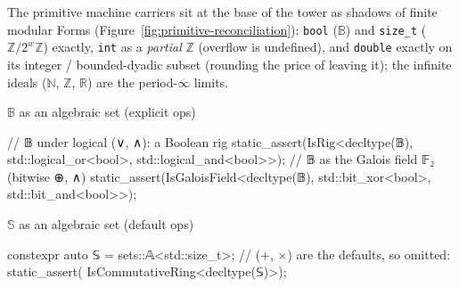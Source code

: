 \documentclass[11pt, a4paper]{article}
\begin{document}
The primitive machine carriers sit at the base of the tower as shadows of finite modular Forms (Figure~\ref{fig:primitive-reconciliation}): \texttt{bool} ($\mathbb{B}$) and \texttt{size\_t} ($\mathbb{Z}/2^{w}\mathbb{Z}$) exactly, \texttt{int} as a \emph{partial} $\mathbb{Z}$ (overflow is undefined), and \texttt{double} exactly on its integer / bounded-dyadic subset (rounding the price of leaving it); the infinite ideals ($\mathbb{N}$, $\mathbb{Z}$, $\mathbb{R}$) are the period-$\infty$ limits.

\begin{listing}[!ht]
\caption{Primitive carriers as \emph{algebraic sets}, inhabiting the set-indexed concepts of Listing~\ref{lst:algebra:universal}.  \textbf{Left:} $\mathbb{B} = \mathbb{A}\langle\texttt{bool}\rangle$ needs \emph{explicit} operators: a Boolean rig under logical $(\vee,\wedge)$ and the Galois field $\mathbb{F}_2$ under bitwise $(\oplus,\wedge)$.  \textbf{Right:} $\mathbb{S} = \mathbb{A}\langle\texttt{size\_t}\rangle$, the modular ring $\mathbb{Z}/2^{w}\mathbb{Z}$ (width $w$ implementation-defined), is a commutative ring under the \emph{default} arithmetic $(+,\times)$, so the operators are omitted.  The complementary set-lattice layer ($\cup,\cap$) is Listing~\ref{lst:pruning}; composite carriers such as $\mathbb{Q}$ appear in \S\ref{sec:hsp_varieties}.}
\label{lst:algebra:boolean_case}
\noindent
\begin{minipage}[t]{0.52\linewidth}
$\mathbb{B}$ as an algebraic set (explicit ops)
\begin{cpp}
// 𝔹 under logical (∨, ∧): a Boolean rig
static_assert(IsRig<decltype(𝔹),
    std::logical_or<bool>,
    std::logical_and<bool>>);
// 𝔹 as the Galois field 𝔽₂ (bitwise ⊕, ∧)
static_assert(IsGaloisField<decltype(𝔹),
    std::bit_xor<bool>,
    std::bit_and<bool>>);
\end{cpp}
\end{minipage}\hfill
\begin{minipage}[t]{0.45\linewidth}
$\mathbb{S}$ as an algebraic set (default ops)
\begin{cpp}
constexpr auto 𝕊 = sets::𝔸<std::size_t>{};
// (+, ×) are the defaults, so omitted:
static_assert(
  IsCommutativeRing<decltype(𝕊)>);
\end{cpp}
\end{minipage}
\end{listing}
\end{document}
